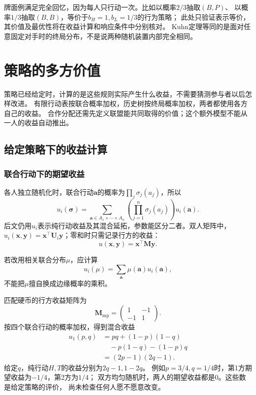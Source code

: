 牌面例满足完全回忆，因为每人只行动一次。比如以概率\(2/3\)抽取\((B,P)\)、
以概率\(1/3\)抽取\((B,B)\)，等价于\(b_H=1,b_L=1/3\)的行为策略；
此处只验证表示等价，其价值及最优性将在收益计算和响应条件中分别核对。
Kuhn定理等同的是面对任意固定对手时的终局分布，不是说两种随机装置内部完全相同。

\section{策略的多方价值}
\label{sec:game-multiparty-value}

策略已经给定时，计算的是这些规则实际产生什么收益，不需要猜测参与者以后怎样改进。
有限行动表按联合概率加权，历史树按终局概率加权，两者都使用各方自己的收益。
合作分配还需先定义联盟能共同取得的价值；这个额外模型不能从一人的收益自动推出。

\subsection{给定策略下的收益计算}
\label{sec:game-fixed-policy-payoffs}

\subsubsection{联合行动下的期望收益}
\label{sec:game-joint-expected-payoff}

各人独立随机化时，联合行动\(\bm a\)的概率为\(\prod_j\sigma_j(a_j)\)，所以
\begin{equation}
  u_i(\bm{\sigma})
  =
  \sum_{\bm{a}\in A_1\times\cdots\times A_n}
  \left(
    \prod_{j=1}^{n}\sigma_j(a_j)
  \right)
  u_i(\bm{a}).
  \label{eq:game-mixed-payoff-extension}
\end{equation}
后文仍用\(u_i\)表示纯行动收益及其混合延拓，参数能区分二者。双人矩阵中，
\(u_i(\bm x,\bm y)=\bm x^\top\bm U_i\bm y\)；零和时只需记录行方的收益：
\begin{equation}
  u(\bm{x},\bm{y})
  =
  \bm{x}^{\top}\bm{M}\bm{y}.
  \label{eq:game-matrix-expected-payoff}
\end{equation}

若改用相关联合分布\(\mu\)，应计算
\[
  u_i(\mu)=\sum_{\bm a}\mu(\bm a)u_i(\bm a),
\]
不能把\(\mu\)擅自换成边缘概率的乘积。

匹配硬币的行方收益矩阵为
\[
  \bm M_{\mathrm{mp}}=
  \begin{pmatrix}1&-1\\-1&1\end{pmatrix}.
\]
按四个联合行动的概率加权，得到混合收益
\[
  \begin{aligned}
    u_1(p,q)&=pq+(1-p)(1-q)\\
      &\quad-p(1-q)-(1-p)q\\
      &=(2p-1)(2q-1).
  \end{aligned}
\]
给定\(q\)，纯行动\(H,T\)的收益分别为\(2q-1,1-2q\)。
例如\(p=3/4,q=1/4\)时，第1方期望收益为\(-1/4\)，第2方为\(1/4\)；
双方均匀随机时，两人的期望收益都是\(0\)。这些数是给定策略的评价，
尚未检查任何人愿不愿意改变。

